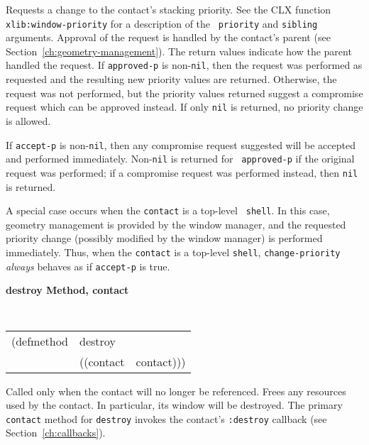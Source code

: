 \begin{flushright}\parbox[t]{6.125in}{
Requests a change to the contact's stacking priority.
See the CLX function {\tt xlib:window-priority} for a description of the {\tt
priority} and {\tt sibling} arguments.
Approval of the request is handled by the contact's parent (see
Section~\ref{ch:geometry-management}).
The return values indicate how the parent handled the 
request. If {\tt approved-p} is non-{\tt nil}, then the request was performed as
requested and
the resulting new priority values are returned.  Otherwise, the request was not
performed, but the priority
values returned suggest a compromise request which can be approved instead.
If only {\tt nil} is returned, no priority change is allowed.
}\end{flushright}

\begin{flushright}\parbox[t]{6.125in}{
If {\tt accept-p} is non-{\tt nil}, then any compromise request suggested will be
accepted and performed immediately. Non-{\tt nil} is returned for {\tt
approved-p} if the original request was performed; if a compromise request was
performed instead, then {\tt nil} is returned.
}\end{flushright}

\begin{flushright}\parbox[t]{6.125in}{ 
A special case occurs when the {\tt contact} is a top-level {\tt
shell}. In this case, geometry management
is provided by the window manager, and the requested
priority
change (possibly modified by the window manager) is performed immediately.
Thus, when the {\tt contact} is a top-level {\tt shell}, {\tt change-priority}
{\em always} behaves as if {\tt accept-p} is true.
}\end{flushright}


{\samepage
{\large {\bf destroy \hfill Method, contact}}
\begin{flushright}
\parbox[t]{6.125in}{
\tt
\begin{tabular}{lll}
\raggedright
(defmethod & destroy & \\
& ((contact  &contact)))
\end{tabular}
\rm
}\end{flushright}

\begin{flushright}\parbox[t]{6.125in}{
Called only when the contact will no longer be referenced. Frees any
resources used by the contact. In particular, its window will be destroyed.
The primary {\tt contact} method for {\tt destroy} invokes the contact's
{\tt :destroy} callback (see Section~\ref{ch:callbacks}).
}\end{flushright} }



